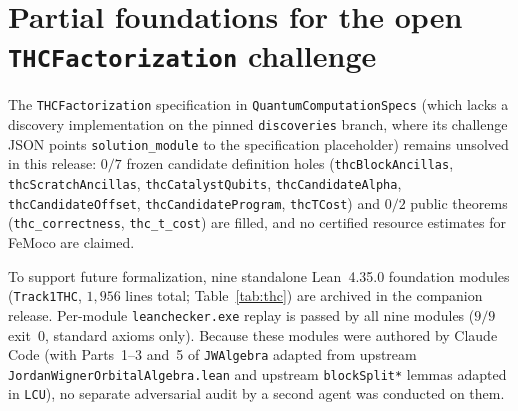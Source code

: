 \documentclass[11pt,a4paper]{article}
\theoremstyle{definition}
\theoremstyle{remark}
\begin{document}
\FloatBarrier
\section{Partial foundations for the open \texttt{THC\allowbreak Factorization} challenge}
\label{app:thc}

The \texttt{THC\allowbreak Factorization} specification in \texttt{Quantum\allowbreak Computation\allowbreak Specs} (which lacks a discovery implementation on the pinned \texttt{discoveries} branch, where its challenge JSON points \texttt{solution\_\allowbreak module} to the specification placeholder) remains unsolved in this release: \(0/7\) frozen candidate definition holes (\texttt{thcBlock\allowbreak Ancillas}, \texttt{thcScratch\allowbreak Ancillas}, \texttt{thcCatalyst\allowbreak Qubits}, \texttt{thcCandidate\allowbreak Alpha}, \texttt{thcCandidate\allowbreak Offset}, \texttt{thcCandidate\allowbreak Program}, \texttt{thcTCost}) and \(0/2\) public theorems (\texttt{thc\_\allowbreak correctness}, \texttt{thc\_\allowbreak t\_cost}) are filled, and no certified resource estimates for FeMoco are claimed.

To support future formalization, nine standalone Lean~4.35.0 foundation modules (\texttt{Track1\allowbreak THC}, \(1{,}956\) lines total; Table~\ref{tab:thc}) are archived in the companion release. Per-module \texttt{lean\allowbreak checker.exe} replay is passed by all nine modules (\(9/9\) exit~\(0\), standard axioms only). Because these modules were authored by Claude Code (with Parts~1--3 and~5 of \texttt{JWAlgebra} adapted from upstream \texttt{JordanWignerOrbitalAlgebra.lean} and upstream \texttt{blockSplit*} lemmas adapted in \texttt{LCU}), no separate adversarial audit by a second agent was conducted on them.
\end{document}
